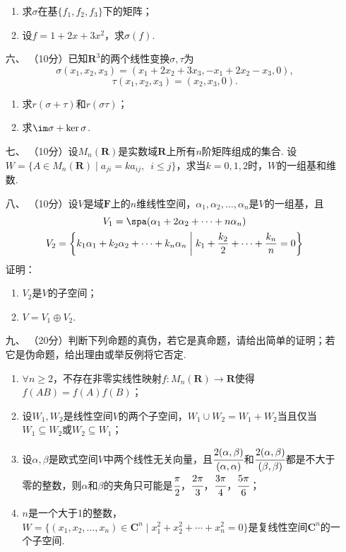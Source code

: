 \begin{enumerate}
\begin{enumerate}[label=(\arabic*)]
        \item 求$\sigma$在基$\{f_1,f_2,f_3\}$下的矩阵；

        \item 设$f=1+2x+3x^2$，求$\sigma(f)$.
    \end{enumerate}
	\item[六、]（10分）已知$\mathbf{R}^3$的两个线性变换$\sigma,\tau$为
	\[\sigma(x_1,x_2,x_3)=(x_1+2x_2+3x_3,-x_1+2x_2-x_3,0),\]
    \[\tau(x_1,x_2,x_3)=(x_2,x_3,0).\]
    \begin{enumerate}[label=(\arabic*)]
        \item 求$r(\sigma+\tau)$和$r(\sigma\tau)$；

        \item 求$\im\sigma+\ker\sigma$.
    \end{enumerate}
	\item[七、]（10分）设$M_n(\mathbf{R})$是实数域$\mathbf{R}$上所有$n$阶矩阵组成的集合. 设$W=\{A\in M_n(\mathbf{R})\mid a_{ji}=ka_{ij},\enspace i\leqslant j\}$，求当$k=0,1,2$时，$W$的一组基和维数.

    \item[八、]（10分）设$V$是域$\mathbf{F}$上的$n$维线性空间，$\alpha_1,\alpha_2,\ldots,\alpha_n$是$V$的一组基，且
    \begin{gather*}
        V_1=\spa(\alpha_1+2\alpha_2+\cdots+n\alpha_n) \\
        V_2=\left\{k_1\alpha_1+k_2\alpha_2+\cdots+k_n\alpha_n \;\middle|\; k_1+\dfrac{k_2}{2}+\cdots+\dfrac{k_n}{n}=0\right\}
    \end{gather*}
    证明：
    \begin{enumerate}[label=(\arabic*)]
        \item $V_2$是$V$的子空间；

        \item $V=V_1\oplus V_2$.
    \end{enumerate}
	\item[九、]（20分）判断下列命题的真伪，若它是真命题，请给出简单的证明；若它是伪命题，给出理由或举反例将它否定.
    \begin{enumerate}[label=(\arabic*)]
        \item $\forall n\geqslant 2$，不存在非零实线性映射$f:M_n(\mathbf{R})\to\mathbf{R}$使得$f(AB)=f(A)f(B)$；

        \item 设$W_1,W_2$是线性空间$V$的两个子空间，$W_1\cup W_2=W_1+W_2$当且仅当$W_1\subseteq W_2$或$W_2\subseteq W_1$；

        \item 设$\alpha,\beta$是欧式空间$V$中两个线性无关向量，且$\cfrac{2(\alpha,\beta)}{(\alpha,\alpha)}$和$\cfrac{2(\alpha,\beta)}{(\beta,\beta)}$都是不大于零的整数，则$\alpha$和$\beta$的夹角只可能是$\cfrac{\pi}{2}$，$\cfrac{2\pi}{3}$，$\cfrac{3\pi}{4}$，$\cfrac{5\pi}{6}$；

        \item $n$是一个大于1的整数，$W=\{(x_1,x_2,\ldots,x_n)\in\mathbf{C}^n\mid x_1^2+x_2^2+\cdots+x_n^2=0\}$是复线性空间$\mathbf{C}^n$的一个子空间.
    \end{enumerate}
\end{enumerate}

\clearpage
